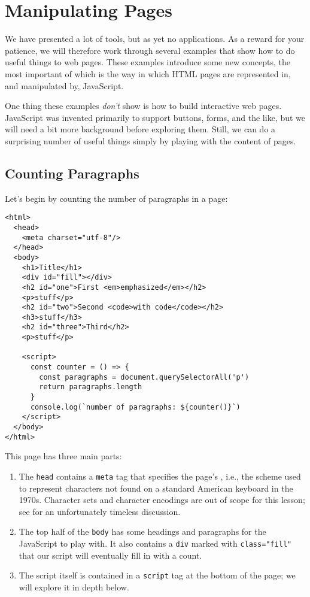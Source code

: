 \chapter{Manipulating Pages}\label{s:pages}

We have presented a lot of tools, but as yet no applications.
As a reward for your patience,
we will therefore work through several examples that show
how to do useful things to web pages.
These examples introduce some new concepts,
the most important of which is the way in which HTML pages are represented in,
and manipulated by,
JavaScript.

One thing these examples \emph{don't} show is how to build interactive web pages.
JavaScript was invented primarily to support buttons, forms, and the like,
but we will need a bit more background before exploring them.
Still,
we can do a surprising number of useful things
simply by playing with the content of pages.

\section{Counting Paragraphs}\label{s:pages-counting}

Let's begin by counting the number of paragraphs in a page:

\begin{verbatim}
<html>
  <head>
    <meta charset="utf-8"/>
  </head>
  <body>
    <h1>Title</h1>
    <div id="fill"></div>
    <h2 id="one">First <em>emphasized</em></h2>
    <p>stuff</p>
    <h2 id="two">Second <code>with code</code></h2>
    <h3>stuff</h3>
    <h2 id="three">Third</h2>
    <p>stuff</p>

    <script>
      const counter = () => {
        const paragraphs = document.querySelectorAll('p')
        return paragraphs.length
      }
      console.log(`number of paragraphs: ${counter()}`)
    </script>
  </body>
</html>
\end{verbatim}

This page has three main parts:

\begin{enumerate}
\item
  The \texttt{head} contains a \texttt{meta} tag that specifies the page's
  ,
  i.e.,
  the scheme used to represent characters
  not found on a standard American keyboard in the 1970s.
  Character sets and character encodings are out of scope for this lesson;
  see 
  for an unfortunately timeless discussion.
\item
  The top half of the \texttt{body} has some headings and paragraphs
  for the JavaScript to play with.
  It also contains a \texttt{div} marked with \texttt{class="fill"}
  that our script will eventually fill in with a count.
\item
  The script itself is contained in a \texttt{script} tag at the bottom of the page;
  we will explore it in depth below.
\end{enumerate}

